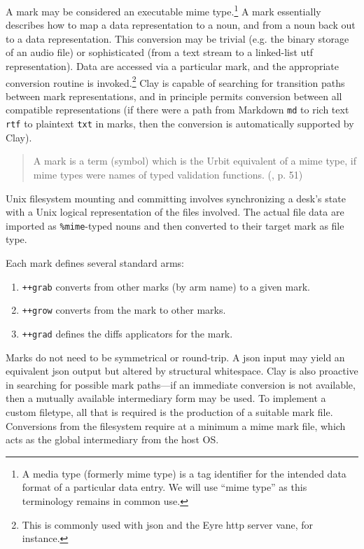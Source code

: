 \documentclass[twoside]{article}
\begin{document}
A mark may be considered an executable {\sc mime} type.\footnote{A media type (formerly {\sc mime} type) is a tag identifier for the intended data format of a particular data entry. We will use “{\sc mime} type” as this terminology remains in common use.}  A mark essentially describes how to map a data representation to a noun, and from a noun back out to a data representation.  This conversion may be trivial (e.g. the binary storage of an audio file) or sophisticated (from a text stream to a linked-list {\sc utf} representation).  Data are accessed via a particular mark, and the appropriate conversion routine is invoked.\footnote{This is commonly used with {\sc json} and the Eyre {\sc http} server vane, for instance.}  Clay is capable of searching for transition paths between mark representations, and in principle permits conversion between all compatible representations (if there were a path from Markdown \texttt{md} to rich text \texttt{rtf} to plaintext \texttt{txt} in marks, then the conversion is automatically supported by Clay).

\begin{quote}
  A mark is a term (symbol) which is the Urbit equivalent of a {\sc mime} type, if {\sc mime} types were names of typed validation functions.  (\citet{Whitepaper}, p. 51)
\end{quote}

Unix filesystem mounting and committing involves synchronizing a desk's state with a Unix logical representation of the files involved.  The actual file data are imported as \lstinline[style=inlinecode]{%mime}-typed nouns and then converted to their target mark as file type.

Each mark defines several standard arms:

\begin{enumerate}
  \item  \lstinline[style=inlinecode]{++grab} converts from other marks (by arm name) to a given mark.
  \item  \lstinline[style=inlinecode]{++grow} converts from the mark to other marks.
  \item  \lstinline[style=inlinecode]{++grad} defines the diffs applicators for the mark.
\end{enumerate}

\noindent
Marks do not need to be symmetrical or round-trip.  A {\sc json} input may yield an equivalent {\sc json} output but altered by structural whitespace.  Clay is also proactive in searching for possible mark paths—if an immediate conversion is not available, then a mutually available intermediary form may be used.  To implement a custom filetype, all that is required is the production of a suitable mark file.  Conversions from the filesystem require at a minimum a {\sc mime} mark file, which acts as the global intermediary from the host OS.
\end{document}
